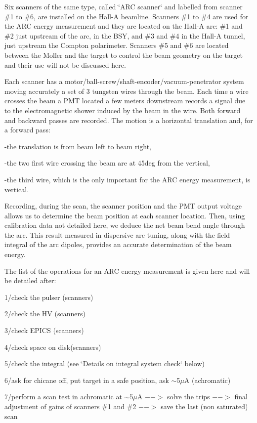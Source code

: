Six scanners of the same type, called \char`\"{}ARC scanner\char`\"{} and labelled
from scanner \#1 to \#6, are installed on the Hall-A beamline. Scanners \#1
to \#4 are used for the ARC energy measurement and they are located on the Hall-A
arc: \#1 and \#2 just upstream of the arc, in the BSY, and \#3 and \#4 in the Hall-A
tunnel, just upstream the Compton polarimeter. Scanners \#5 and \#6 are located
between the Moller and the target to control the beam geometry on the target
and their use will not be discussed here. 

Each scanner has a motor/ball-screw/shaft-encoder/vacuum-penetrator system moving
accurately a set of 3 tungsten wires through the beam. Each time a wire crosses
the beam a PMT located a few meters downstream records a signal due to the electromagnetic
shower induced by the beam in the wire. Both forward and backward passes are
recorded. The motion is a horizontal translation and, for a forward pass: 

-the translation is from beam left to beam right, 

-the two first wire crossing the beam are at 45deg from the vertical, 

-the third wire, which is the only important for the ARC energy measurement,
is vertical. 

Recording, during the scan, the scanner position and the PMT output voltage
allows us to determine the beam position at each scanner location. Then, using
calibration data not detailed here, we deduce the net beam bend angle through
the arc. This result measured in dispersive arc tuning, along with the field
integral of the arc dipoles, provides an accurate determination of the beam
energy. 

The list of the operations for an ARC energy measurement is given here and will
be detailed after: 

1/check the pulser (scanners) 

2/check the HV (scanners) 

3/check EPICS (scanners) 

4/check space on disk(scanners) 

5/check the integral (see \char`\"{}Details on integral system check\char`\"{}
below) 

6/ask for chicane off, put target in a safe position, ask \( \sim\)5$\mu$A (achromatic) 

7/perform a scan test in achromatic at \( \sim  \)5$\mu$A
$-->$ solve the trips $-->$ final
adjustment of gains of scanners \#1 and \#2 $-->$ save the last (non saturated)
scan 

